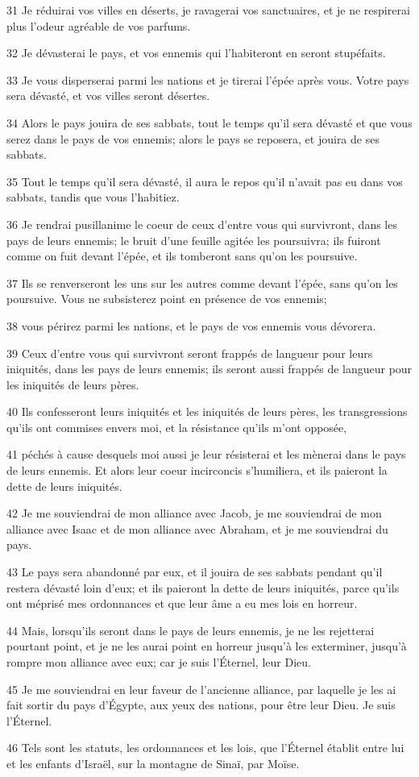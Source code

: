 \par 31 Je réduirai vos villes en déserts, je ravagerai vos sanctuaires, et je ne respirerai plus l'odeur agréable de vos parfums.
\par 32 Je dévasterai le pays, et vos ennemis qui l'habiteront en seront stupéfaits.
\par 33 Je vous disperserai parmi les nations et je tirerai l'épée après vous. Votre pays sera dévasté, et vos villes seront désertes.
\par 34 Alors le pays jouira de ses sabbats, tout le temps qu'il sera dévasté et que vous serez dans le pays de vos ennemis; alors le pays se reposera, et jouira de ses sabbats.
\par 35 Tout le temps qu'il sera dévasté, il aura le repos qu'il n'avait pas eu dans vos sabbats, tandis que vous l'habitiez.
\par 36 Je rendrai pusillanime le coeur de ceux d'entre vous qui survivront, dans les pays de leurs ennemis; le bruit d'une feuille agitée les poursuivra; ils fuiront comme on fuit devant l'épée, et ils tomberont sans qu'on les poursuive.
\par 37 Ils se renverseront les uns sur les autres comme devant l'épée, sans qu'on les poursuive. Vous ne subsisterez point en présence de vos ennemis;
\par 38 vous périrez parmi les nations, et le pays de vos ennemis vous dévorera.
\par 39 Ceux d'entre vous qui survivront seront frappés de langueur pour leurs iniquités, dans les pays de leurs ennemis; ils seront aussi frappés de langueur pour les iniquités de leurs pères.
\par 40 Ils confesseront leurs iniquités et les iniquités de leurs pères, les transgressions qu'ils ont commises envers moi, et la résistance qu'ils m'ont opposée,
\par 41 péchés à cause desquels moi aussi je leur résisterai et les mènerai dans le pays de leurs ennemis. Et alors leur coeur incirconcis s'humiliera, et ils paieront la dette de leurs iniquités.
\par 42 Je me souviendrai de mon alliance avec Jacob, je me souviendrai de mon alliance avec Isaac et de mon alliance avec Abraham, et je me souviendrai du pays.
\par 43 Le pays sera abandonné par eux, et il jouira de ses sabbats pendant qu'il restera dévasté loin d'eux; et ils paieront la dette de leurs iniquités, parce qu'ils ont méprisé mes ordonnances et que leur âme a eu mes lois en horreur.
\par 44 Mais, lorsqu'ils seront dans le pays de leurs ennemis, je ne les rejetterai pourtant point, et je ne les aurai point en horreur jusqu'à les exterminer, jusqu'à rompre mon alliance avec eux; car je suis l'Éternel, leur Dieu.
\par 45 Je me souviendrai en leur faveur de l'ancienne alliance, par laquelle je les ai fait sortir du pays d'Égypte, aux yeux des nations, pour être leur Dieu. Je suis l'Éternel.
\par 46 Tels sont les statuts, les ordonnances et les lois, que l'Éternel établit entre lui et les enfants d'Israël, sur la montagne de Sinaï, par Moïse.

